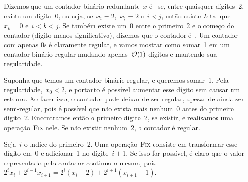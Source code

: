\documentclass[main.tex]{subfiles}
\begin{document}
Dizemos que um contador binário redundante~$x$ é~ se, entre quaisquer dígitos~2, existe um dígito~0, ou seja, se~${x_i = 2}$,~${x_j = 2}$ e~$i < j$, então existe~$k$ tal que~${x_k = 0}$ e~${i < k < j}$. Se também existe um~0 entre o primeiro~2 e o começo do contador (dígito menos significativo), dizemos que o contador é~. Um contador com apenas 0s é claramente regular, e vamos mostrar como somar~1 em um contador binário regular mudando apenas~$\mathcal{O}(1)$ dígitos e mantendo sua regularidade.

Suponha que temos um contador binário regular, e queremos somar~1. Pela regularidade,~${x_0 < 2}$, e portanto é possível aumentar esse dígito sem causar um estouro. Ao fazer isso, o contador pode deixar de ser regular, apesar de ainda ser semi-regular, pois é possível que não exista mais nenhum~0 antes do primeiro dígito~2. Encontramos então o primeiro dígito~2, se existir, e realizamos uma operação~\textsc{Fix} nele. Se não existir nenhum~2, o contador é regular.

Seja~$i$ o índice do primeiro~2. Uma operação~\textsc{Fix} consiste em transformar esse dígito em~0 e adicionar~1 no dígito~$i+1$. Se isso for possível, é claro que o valor representado pelo contador continua o mesmo, pois~$2^i x_i + 2^{i+1} x_{i+1} = 2^i (x_i - 2) + 2^{i+1} (x_{i+1} + 1)$.
\end{document}
